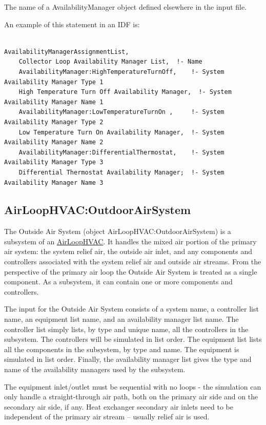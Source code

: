 The name of a AvailabilityManager object defined elsewhere in the input file.

An example of this statement in an IDF is:

\begin{lstlisting}

AvailabilityManagerAssignmentList,
    Collector Loop Availability Manager List,  !- Name
    AvailabilityManager:HighTemperatureTurnOff,    !- System Availability Manager Type 1
    High Temperature Turn Off Availability Manager,  !- System Availability Manager Name 1
    AvailabilityManager:LowTemperatureTurnOn ,     !- System Availability Manager Type 2
    Low Temperature Turn On Availability Manager,  !- System Availability Manager Name 2
    AvailabilityManager:DifferentialThermostat,    !- System Availability Manager Type 3
    Differential Thermostat Availability Manager;  !- System Availability Manager Name 3
\end{lstlisting}

\subsection{AirLoopHVAC:OutdoorAirSystem}\label{airloophvacoutdoorairsystem}

The Outside Air System (object AirLoopHVAC:OutdoorAirSystem) is a subsystem of an \hyperref[airloophvac]{AirLoopHVAC}. It handles the mixed air portion of the primary air system: the system relief air, the outside air inlet, and any components and controllers associated with the system relief air and outside air streams. From the perspective of the primary air loop the Outside Air System is treated as a single component. As a subsystem, it can contain one or more components and controllers.

The input for the Outside Air System consists of a system name, a controller list name, an equipment list name, and an availability manager list name. The controller list simply lists, by type and unique name, all the controllers in the subsystem. The controllers will be simulated in list order. The equipment list lists all the components in the subsystem, by type and name. The equipment is simulated in list order. Finally, the availability manager list gives the type and name of the availability managers used by the subsystem.

The equipment inlet/outlet must be sequential with no loops - the simulation can only handle a straight-through air path, both on the primary air side and on the secondary air side, if any. Heat exchanger secondary air inlets need to be independent of the primary air stream -- usually relief air is used.

